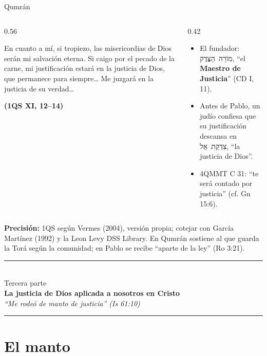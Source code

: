 \documentclass[hyperref={bookmarks=false},aspectratio=169]{beamer}
\newcommand{\heb}[1]{\mbox{\foreignlanguage{hebrew}{#1}}}
\newcommand{\fuente}[1]{\par\hfill{\upshape\bfseries\footnotesize\textcolor{azul}{#1}}}
\newcommand{\destacar}[1]{\textbf{\textcolor{azul}{#1}}}
\newcommand{\precision}[1]{{\footnotesize\color{gris}\textbf{Precisión:} #1}}
\begin{document}
\begin{frame}{Qumrán}
\begin{columns}[c,onlytextwidth]
\begin{column}{0.56\textwidth}
\begin{cita}En cuanto a mí, si tropiezo, las misericordias de Dios serán mi salvación eterna. Si caigo por el pecado de la carne, mi justificación estará en la justicia de Dios, que permanece para siempre\ldots{} Me juzgará en la justicia de su verdad\ldots\fuente{(1QS XI, 12--14)}\end{cita}
\end{column}
\begin{column}{0.42\textwidth}\small
\begin{itemize}
\item El fundador: \heb{מוֹרֵה הַצֶּדֶק}, ``el \destacar{Maestro de Justicia}'' (CD I, 11).
\item Antes de Pablo, un judío confiesa que su justificación descansa en \heb{צִדְקַת אֵל}, ``la justicia de Dios''.
\item 4QMMT C 31: ``te será contado por justicia'' (cf. Gn 15:6).
\end{itemize}
\end{column}
\end{columns}\par\smallskip
\precision{1QS según Vermes (2004), versión propia; cotejar con García Martínez (1992) y la Leon Levy DSS Library. En Qumrán sostiene al que guarda la Torá según la comunidad; en Pablo se recibe ``aparte de la ley'' (Ro 3:21).}
\end{frame}

\begin{frame}[plain]
\vfill\centering
{\color{dorado}\rule{0.55\linewidth}{1.2pt}}\\[8pt]
{\large\color{gris}Tercera parte}\\[4pt]
{\LARGE\bfseries\color{azul}La justicia de Dios aplicada a nosotros en Cristo}\\[8pt]
{\small\itshape\color{gris}``Me rodeó de manto de justicia'' (Is 61:10)}\\[8pt]
{\color{dorado}\rule{0.55\linewidth}{1.2pt}}
\vfill
\end{frame}

\section{El manto}
\end{document}
